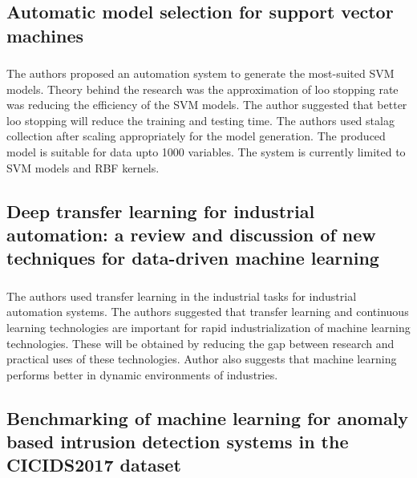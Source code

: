 \subsection{Automatic model selection for support vector machines}
\subsubsection{\citeauthor*{ref_paper_2} \citeyearpar{ref_paper_2}}

The authors proposed an automation system to generate the most-suited SVM models. Theory behind the research was the approximation of loo stopping rate was reducing the efficiency of the SVM models. The author suggested that better loo stopping will reduce the training and testing time. The authors used stalag collection after scaling appropriately for the model generation. The produced model is suitable for data upto 1000 variables. The system is currently limited to SVM models and RBF kernels.

\subsection{Deep transfer learning for industrial automation: a review and discussion of new techniques for data-driven machine learning}
\subsubsection{\citeauthor*{ref_paper_13} \citeyearpar{ref_paper_13}}

The authors used transfer learning in the industrial tasks for industrial automation systems. The authors suggested that transfer learning and continuous learning technologies are important for rapid industrialization of machine learning technologies. These will be obtained by reducing the gap between research and practical uses of these technologies. Author also suggests that machine learning performs better in dynamic environments of industries.

\subsection{Benchmarking of machine learning for anomaly based intrusion detection systems in the CICIDS2017 dataset}
\subsubsection{\citeauthor*{ref_paper_21} \citeyearpar{ref_paper_21}}

